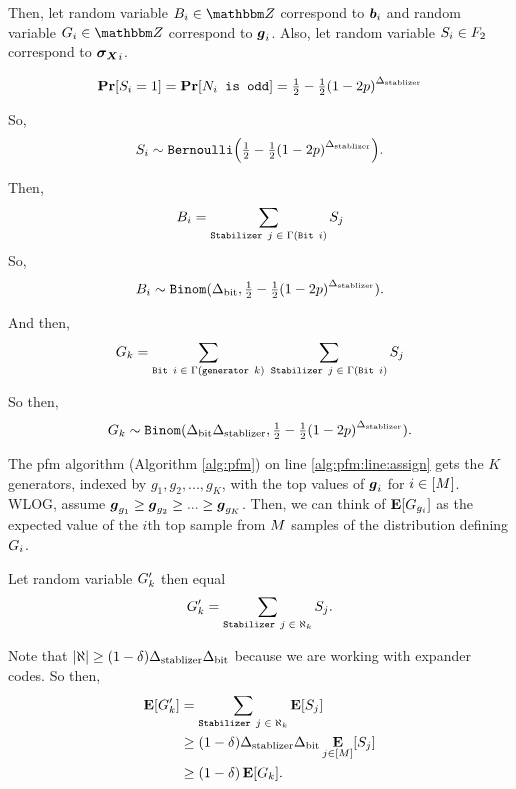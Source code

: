 Then, let random variable $\bitscoreRV_i \in \Z$ correspond to $\boldsymbol{b}_i$ and random variable $\generatorscoreRV_i \in \Z$
correspond to $\boldsymbol{g}_i$. Also, let random variable $S_i \in F_2$ correspond  to $\boldsymbol{\boldsymbol{\sigma_X}}_i$.

\newcommand{\SPr}{\half - \half\mleft(1-2p\mright)^\NTQ}
\begin{align*}
	\Pr[S_i = 1] = \Pr\mleft[\texttt{$N_i$ is odd}\mright] = \SPr
\end{align*}

So,
$$
	\syndromeRV_i \sim \texttt{Bernoulli}\mleft(\SPr\mright).
$$

Then,
$$
	B_i = \sum_{\texttt{Stabilizer $j$} \; \in \; \Gamma(\texttt{Bit $i$})} S_j
$$
So, 
$$
	\bitscoreRV_i \sim \texttt{Binom}(\NTS, \SPr).
$$

And then,
$$
	G_k =
		\sum_{\texttt{Bit $i$} \; \in \; \Gamma(\texttt{generator } k)}\;
			\sum_{\texttt{Stabilizer } j \; \in \; \Gamma(\texttt{Bit } i)}
				S_j
$$

So then,
$$
	\generatorscoreRV_k \sim \texttt{Binom}(\NTS \NTQ, \SPr).
$$

The pfm algorithm (Algorithm \ref{alg:pfm}) on line \ref{alg:pfm:line:assign}
gets the $K$ generators, indexed by $g_1, g_2, ..., g_K$, with the top values
of $\boldsymbol{g}_i$ for $i \in [M]$. WLOG, assume
$\boldsymbol{g}_{g_1} \geq \boldsymbol{g}_{g_2} \geq ... \geq \boldsymbol{g}_{g_K}$.
Then, we can think of $\operatorname*{\mathbf{E}}[G_{g_i}]$ as the expected value of the $i$th
top sample from $M$ samples of the distribution defining $G_i$.

Let random variable $G'_k$ then equal
$$
	G'_k =
		\sum_{\texttt{Stabilizer $j$} \; \in \; \aleph_k} S_j.
$$

Note that $|\aleph| \geq (1 - \delta) {\Delta_{\text{stablizer}}} {\Delta_{\text{bit}}}$ because we are working with expander codes.
So then, \begin{align*}
	\operatorname*{\mathbf{E}}[G'_k] &= 
		\sum_{\texttt{Stabilizer $j$} \; \in \; \aleph_k} \operatorname*{\mathbf{E}}[S_j] \\
		&\geq (1 - \delta) {\Delta_{\text{stablizer}}} {\Delta_{\text{bit}}} \operatorname*{\mathbf{E}}_{j \in [M]}[S_j]\\
		&\geq (1 - \delta) \operatorname*{\mathbf{E}}[G_k].
\end{align*}


